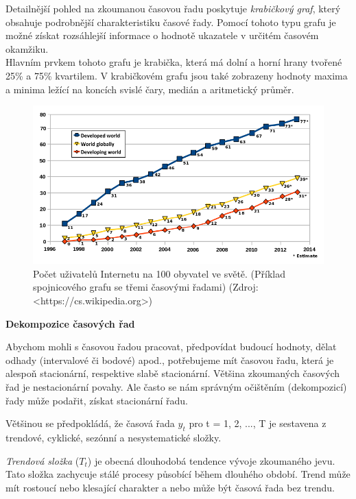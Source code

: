 \documentclass[a4paper,12pt,twoside]{scrreprt}
\begin{document}
Detailnější pohled na zkoumanou časovou řadu poskytuje \textit{krabičkový graf}, který obsahuje podrobnější charakteristiku časové řady. Pomocí tohoto typu grafu je možné získat rozsáhlejší informace o hodnotě ukazatele v určitém časovém okamžiku. \\ Hlavním prvkem tohoto grafu je krabička, která má dolní a horní hrany tvořené 25\% a 75\% kvartilem. V krabičkovém grafu jsou také zobrazeny hodnoty maxima a minima ležící na koncích svislé čary, medián a aritmetický průměr. \cite{arlt}

\begin{figure}
  \centering
  \includegraphics[width=15cm]{pictures/users.png}
  \caption{Počet uživatelů Internetu na 100 obyvatel ve světě. \newline(Příklad spojnicového grafu se třemi časovými řadami) \newline(Zdroj: <https://cs.wikipedia.org>)}
  \label{fig:řada}
\end{figure}

\normalsize\textbf{\newline Dekompozice časových řad}

Abychom mohli s časovou řadou pracovat, předpovídat budoucí hodnoty, dělat odhady (intervalové či bodové) apod., potřebujeme mít časovou řadu, která je alespoň stacionární, respektive slabě stacionární. Většina zkoumaných časových řad je nestacionární povahy. Ale často se nám správným očištěním (dekompozicí) řady může podařit, získat stacionární řadu. 

Většinou se předpokládá, že časová řada $y_t$ pro t = 1, 2, ..., T je sestavena z trendové, cyklické, sezónní a nesystematické složky.

\textit{Trendová složka} ($T_t$) je obecná dlouhodobá tendence vývoje zkoumaného jevu. Tato složka zachycuje stálé procesy působící během dlouhého období. Trend může mít rostoucí nebo klesající charakter a nebo může být časová řada bez trendu.
\end{document}
